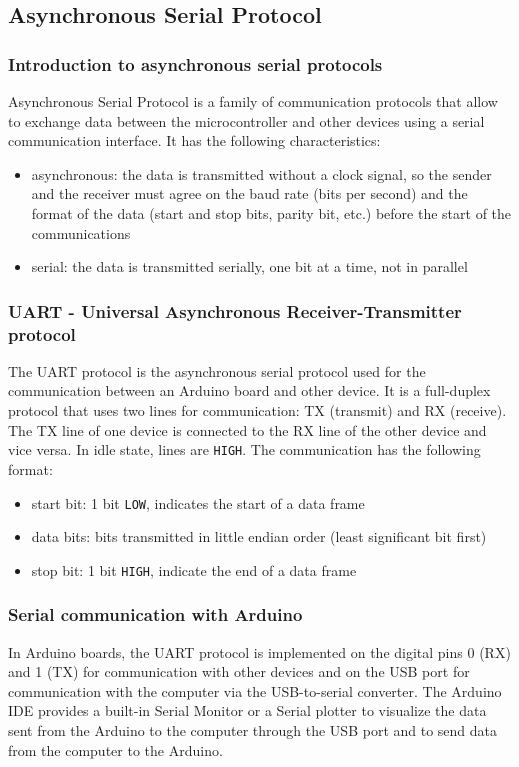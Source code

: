 \newpage

\subsection{Asynchronous Serial Protocol}
\subsubsection*{Introduction to asynchronous serial protocols}
Asynchronous Serial Protocol is a family of communication protocols that allow to exchange data between the microcontroller
and other devices using a serial communication interface. It has the following characteristics:
\begin{itemize}
	\item asynchronous: the data is transmitted without a clock signal, so the sender and the receiver must agree on the baud
	rate (bits per second) and the format of the data (start and stop bits, parity bit, etc.) before the start of the communications
	\item serial: the data is transmitted serially, one bit at a time, not in parallel
\end{itemize}

\subsubsection*{UART - Universal Asynchronous Receiver-Transmitter protocol}
The UART protocol is the asynchronous serial protocol used for the communication between an Arduino board and other device.
It is a full-duplex protocol that uses two lines for communication: TX (transmit) and RX (receive). The TX line of one device
is connected to the RX line of the other device and vice versa. In idle state, lines are \texttt{HIGH}. The communication has
the following format:
\begin{itemize}
	\item start bit: 1 bit \texttt{LOW}, indicates the start of a data frame
	\item data bits: bits transmitted in little endian order (least significant bit first)
	\item stop bit: 1 bit \texttt{HIGH}, indicate the end of a data frame
\end{itemize}

\noindent

\subsubsection*{Serial communication with Arduino}
In Arduino boards, the UART protocol is implemented on the digital pins 0 (RX) and 1 (TX) for communication with other devices
and on the USB port for communication with the computer via the USB-to-serial converter. The Arduino IDE provides a built-in
Serial Monitor or a Serial plotter to visualize the data sent from the Arduino to the computer through the USB port and to send
data from the computer to the Arduino.


